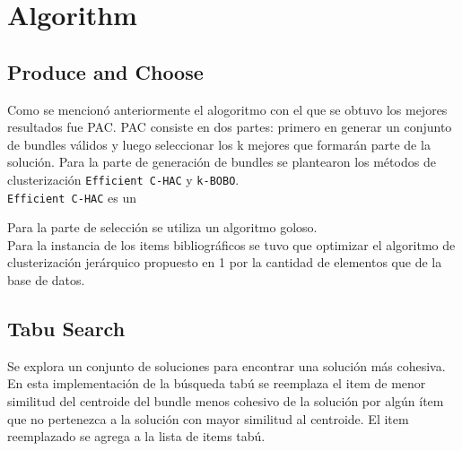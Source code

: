 \section{Algorithm}
\subsection{Produce and Choose}
Como se mencionó anteriormente el alogoritmo con el que se obtuvo los mejores resultados fue PAC. PAC consiste en dos partes: primero en generar un conjunto de bundles válidos y luego seleccionar los k mejores que formarán parte de la solución. Para la parte de generación de bundles se plantearon los métodos de clusterización \texttt{Efficient C-HAC} y \texttt{k-BOBO}.\\
\texttt{Efficient C-HAC} es un 

 Para la parte de selección se utiliza un algoritmo goloso.\\
Para la instancia de los items bibliográficos se tuvo que optimizar el algoritmo de clusterización jerárquico propuesto en 1 por la cantidad de elementos que de la base de datos.\\
 
\subsection{Tabu Search}
Se explora un conjunto de soluciones para encontrar una solución más cohesiva. En esta implementación de la búsqueda tabú se reemplaza el item de menor similitud del centroide del bundle menos cohesivo de la solución por algún ítem que no pertenezca a la solución con mayor similitud al centroide. El item reemplazado se agrega a la lista de items tabú.